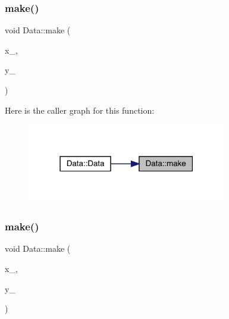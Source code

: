 \mbox{\label{classData_acf9b4e6e52730e9da47d82bda61ac1ca}} 
\subsubsection{\texorpdfstring{make()}{make()}\hspace{0.1cm}{\footnotesize\ttfamily [1/2]}}
{\footnotesize\ttfamily void Data\+::make (\begin{DoxyParamCaption}\item[{const vector$<$ \mbox{\hyperlink{classAbscissa}{Abscissa}} $\ast$ $>$ \&}]{x\+\_\+,  }\item[{const vector$<$ Ensem\+Real $>$ \&}]{y\+\_\+ }\end{DoxyParamCaption})}

Here is the caller graph for this function\+:
\nopagebreak
\begin{figure}[H]
\begin{center}
\leavevmode
\includegraphics[width=247pt]{d0/df3/classData_acf9b4e6e52730e9da47d82bda61ac1ca_icgraph}
\end{center}
\end{figure}
\mbox{\label{classData_acf9b4e6e52730e9da47d82bda61ac1ca}} 
\subsubsection{\texorpdfstring{make()}{make()}\hspace{0.1cm}{\footnotesize\ttfamily [2/2]}}
{\footnotesize\ttfamily void Data\+::make (\begin{DoxyParamCaption}\item[{const vector$<$ \mbox{\hyperlink{classAbscissa}{Abscissa}} $\ast$ $>$ \&}]{x\+\_\+,  }\item[{const vector$<$ Ensem\+Real $>$ \&}]{y\+\_\+ }\end{DoxyParamCaption})}

